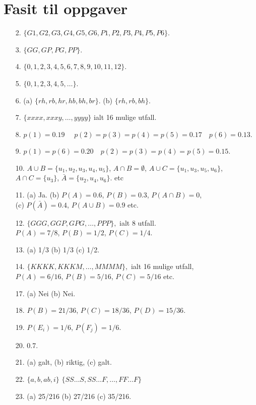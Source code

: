 

%         
\chapter{Fasit til oppgaver}
\begin{itemize}
\item[2.] $ \{G1, G2, G3, G4, G5, G6, P1, P2, P3, P4, P5, P6\}.$
\item[3.] $ \{GG, GP, PG, PP\}.$
\item[4.] $ \{0, 1, 2, 3, 4, 5, 6, 7, 8, 9, 10, 11, 12\}.$
\item[5.] $ \{0, 1, 2, 3, 4, 5, \ldots\}.$
\item[6.]  (a) $\{rh, rb, hr, hb, bh, br\}.$  (b) $\{rh, rb, bh\}.$
\item[7.]  $\{xxxx, xxxy, \ldots ,yyyy\}$ ialt 16 mulige utfall.
\item[8.] $p(1) = 0.19$ \ \ $p(2) = p(3) = p(4) = p(5) = 0.17$\ \ $p(6) = 0.13.$
\item[9.]  $p(1) = p(6) = 0.20$\ \   $p(2) = p(3) = p(4) = p(5) = 0.15.$
\item[10.]  $A\cup B = \{u_1 , u_2 , u_3 , u_4 , u_5\}$, $A\cap B = \emptyset$,
            $A\cup C = \{u_1 ,u_3 ,u_5 ,u_6 \}$, \\
            $A\cap C = \{u_3\}$, $\bar A = \{u_2 ,u_4 ,u_6 \}$. etc
\item[11.]  (a) Ja.  (b) $P(A) = 0.6$, $ P(B) = 0.3$, $P(A\cap B) = 0$,\\
              (c) $P(\bar A) = 0.4$, $P(A\cup B) = 0.9$ etc.
\item[12.]  $\{GGG, GGP, GPG, \ldots , PPP\},$ ialt 8 utfall.\\
              $P(A) = 7/8$, $P(B) = 1/2$, $P(C) = 1/4.$
\item[13.]  (a) 1/3  (b) 1/3  (c) 1/2.
\item[14.] $ \{KKKK, KKKM, \ldots , MMMM\},$ ialt 16 mulige utfall,\\
            $  P(A) = 6/16$,  $P(B) = 5/16$,  $P(C) = 5/16$ etc.
\item[17.]  (a)  Nei   (b)  Nei.
\item[18.] $ P(B) = 21/36$,  $P(C) = 18/36$,  $P(D) = 15/36.$
\item[19.] $ P(E_i) = 1/6$,  $P(F_j) = 1/6.$
\item[20.]  0.7.
\item[21.]  (a)  galt,   (b)  riktig,   (c)  galt.
\item[22.]  $\{a, b, ab, i\}$  $\{SS\ldots S, SS\ldots F, \ldots , FF\ldots F\}$
\item[23.]  (a)  25/216   (b)  27/216   (c)  35/216.
\end{itemize}
         

